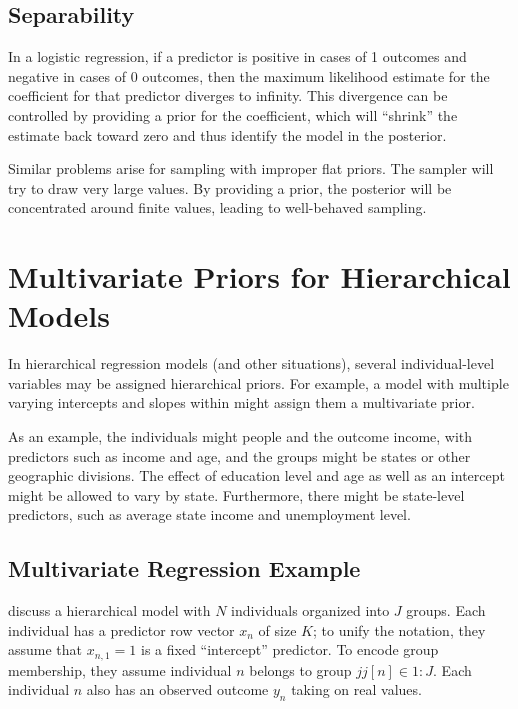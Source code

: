 \subsection{Separability}

In a logistic regression, if a predictor is positive in cases of 1
outcomes and negative in cases of 0 outcomes, then the maximum
likelihood estimate for the coefficient for that predictor diverges to
infinity.  This divergence can be controlled by providing a prior for
the coefficient, which will ``shrink'' the estimate back toward zero
and thus identify the model in the posterior.  

Similar problems arise for sampling with improper flat priors.  The
sampler will try to draw very large values.  By providing a prior,
the posterior will be concentrated around finite values, leading to
well-behaved sampling.



\section{Multivariate Priors for Hierarchical Models}\label{multivariate-hierarchical-priors.section}

In hierarchical regression models (and other situations), several
individual-level variables may be assigned hierarchical priors.  For
example, a model with multiple varying intercepts and slopes within
might assign them a multivariate prior. 

As an example, the individuals might people and the outcome income,
with predictors such as income and age, and the groups might be states
or other geographic divisions.  The effect of education level and age
as well as an intercept might be allowed to vary by state.
Furthermore, there might be state-level predictors, such as average
state income and unemployment level.

\subsection{Multivariate Regression Example}

\cite[Chapter 13, Chapter 17]{GelmanHill:2007} discuss a hierarchical
model with $N$ individuals organized into $J$ groups.  Each individual
has a predictor row vector $x_n$ of size $K$; to unify the notation, they
assume that $x_{n,1} = 1$ is a fixed ``intercept'' predictor.  To
encode group membership, they assume individual $n$ belongs to group
$jj[n] \in 1{:}J$.  Each individual $n$ also has an observed outcome
$y_n$ taking on real values. 

